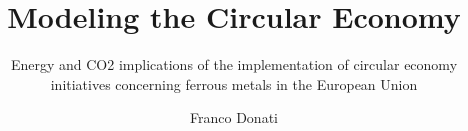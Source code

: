 \documentclass{cml-report}
\begin{document}
\title[white]{Modeling the Circular Economy}
\subtitle[white]{Energy and CO2 implications of the implementation of circular economy initiatives concerning ferrous metals in the European Union}
\author[white]{Franco Donati}
\end{document}
